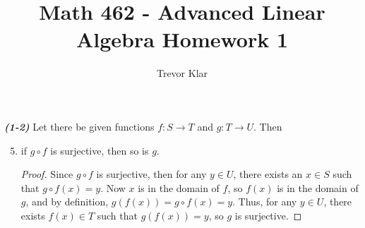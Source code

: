 \documentclass[letterpaper]{article}
\title{Math 462 - Advanced Linear Algebra \linebreak
	Homework 1}
\author{Trevor Klar}
\begin{document}
\maketitle

\begin{proposition*}\emph{\textbf{(1-2)}} Let there be given functions $f:S \to T$ and $g:T \to U$. Then 
\begin{enumerate}[label=(\roman*)]
\setcounter{enumi}{4}
\item if $g \circ f$ is surjective, then so is $g$. 
\begin{proof}
Since $g \circ f$ is surjective, then for any $y \in U$, there exists an $x \in S$ such that $g \circ f(x) = y$. Now $x$ is in the domain of $f$, so $f(x)$ is in the domain of $g$, and by definition, $g(f(x))=g \circ f(x)=y$. Thus, for any $y \in U$, there exists $f(x) \in T$ such that $g(f(x))=y$, so $g$ is surjective.
\end{proof}
\end{enumerate}	
\end{proposition*}
\end{document}
